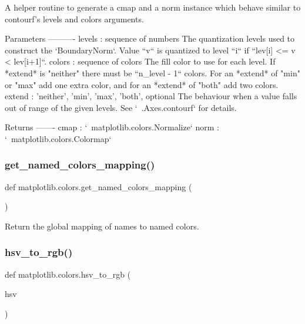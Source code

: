 \begin{DoxyVerb}A helper routine to generate a cmap and a norm instance which
behave similar to contourf's levels and colors arguments.

Parameters
----------
levels : sequence of numbers
    The quantization levels used to construct the `BoundaryNorm`.
    Value ``v`` is quantized to level ``i`` if ``lev[i] <= v < lev[i+1]``.
colors : sequence of colors
    The fill color to use for each level. If *extend* is "neither" there
    must be ``n_level - 1`` colors. For an *extend* of "min" or "max" add
    one extra color, and for an *extend* of "both" add two colors.
extend : {'neither', 'min', 'max', 'both'}, optional
    The behaviour when a value falls out of range of the given levels.
    See `~.Axes.contourf` for details.

Returns
-------
cmap : `~matplotlib.colors.Normalize`
norm : `~matplotlib.colors.Colormap`
\end{DoxyVerb}
 \mbox{\label{namespacematplotlib_1_1colors_ac1f82f4edf38753f7c7d9239c3698137}} 
\subsubsection{\texorpdfstring{get\+\_\+named\+\_\+colors\+\_\+mapping()}{get\_named\_colors\_mapping()}}
{\footnotesize\ttfamily def matplotlib.\+colors.\+get\+\_\+named\+\_\+colors\+\_\+mapping (\begin{DoxyParamCaption}{ }\end{DoxyParamCaption})}

\begin{DoxyVerb}Return the global mapping of names to named colors.\end{DoxyVerb}
 \mbox{\label{namespacematplotlib_1_1colors_aa1382dea0b1d8f49082ccbdec1b800ce}} 
\subsubsection{\texorpdfstring{hsv\+\_\+to\+\_\+rgb()}{hsv\_to\_rgb()}}
{\footnotesize\ttfamily def matplotlib.\+colors.\+hsv\+\_\+to\+\_\+rgb (\begin{DoxyParamCaption}\item[{}]{hsv }\end{DoxyParamCaption})}


